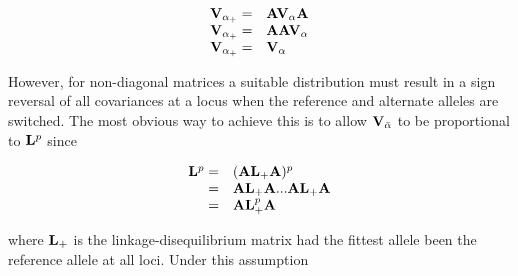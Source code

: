 \documentclass[12pt]{article}
\makeatletter
\providecommand{\DIFaddtex}[1]{{\protect\color{blue}\uwave{#1}}} %
\providecommand{\DIFdeltex}[1]{{\protect\color{red}\sout{#1}}} %
\providecommand{\DIFaddbegin}{} %
\providecommand{\DIFaddend}{} %
\providecommand{\DIFdelbegin}{} %
\providecommand{\DIFdelend}{} %
\providecommand{\DIFadd}[1]{\texorpdfstring{\DIFaddtex{#1}}{#1}} %
\providecommand{\DIFdel}[1]{\texorpdfstring{\DIFdeltex{#1}}{}} %
\newcommand{\DIFscaledelfig}{0.5}
\newlength{\DIFdelgraphicswidth} %
\newlength{\DIFdelgraphicsheight} %
\newcommand{\DIFaddincludegraphics}[2][]{{\color{blue}\fbox{\DIFOincludegraphics[#1]{#2}}}} %
\newcommand{\DIFdelincludegraphics}[2][]{%
\sbox{\DIFdelgraphicsbox}{\DIFOincludegraphics[#1]{#2}}%
\settoboxwidth{\DIFdelgraphicswidth}{\DIFdelgraphicsbox} %
\settoboxtotalheight{\DIFdelgraphicsheight}{\DIFdelgraphicsbox} %
\scalebox{\DIFscaledelfig}{%
\parbox[b]{\DIFdelgraphicswidth}{\usebox{\DIFdelgraphicsbox}\\[-\baselineskip] \rule{\DIFdelgraphicswidth}{0em}}\llap{\resizebox{\DIFdelgraphicswidth}{\DIFdelgraphicsheight}{%
\setlength{\unitlength}{\DIFdelgraphicswidth}%
\begin{picture}(1,1)%
\thicklines\linethickness{2pt} %
{\color[rgb]{1,0,0}\put(0,0){\framebox(1,1){}}}%
{\color[rgb]{1,0,0}\put(0,0){\line( 1,1){1}}}%
{\color[rgb]{1,0,0}\put(0,1){\line(1,-1){1}}}%
\end{picture}%
}\hspace*{3pt}}} %
} %
\DeclareRobustCommand{\DIFaddbegin}{\DIFOaddbegin \let\includegraphics\DIFaddincludegraphics} %
\DeclareRobustCommand{\DIFaddend}{\DIFOaddend \let\includegraphics\DIFOincludegraphics} %
\DeclareRobustCommand{\DIFdelbegin}{\DIFOdelbegin \let\includegraphics\DIFdelincludegraphics} %
\DeclareRobustCommand{\DIFdelend}{\DIFOaddend \let\includegraphics\DIFOincludegraphics} %
\let\sout@orig\sout %
\renewcommand{\sout}[1]{\ifmmode\text{\sout@orig{\ensuremath{#1}}}\else\sout@orig{#1}\fi} %
\makeatother
\begin{document}
\begin{bibunit}
\begin{equation}
\DIFdelbegin %
\DIFdelend \DIFaddbegin \begin{array}{rl}
{\bf V}_{{\alpha}_{+}} =& {\bf A}{\bf V}_{{\alpha}}{\bf A}\\
{\bf V}_{{\alpha}_{+}} =& {\bf A}{\bf A}{\bf V}_{{\alpha}}\\
{\bf V}_{{\alpha}_{+}} =& {\bf V}_{{\alpha}}\\
\end{array}\DIFaddend 
\end{equation}

However, for non-diagonal matrices a suitable distribution must result in a sign reversal of all covariances at a locus when the reference and alternate alleles are switched. The most obvious way to achieve this is to allow \DIFdelbegin \DIFdel{${\bf V}_{\bar{\alpha}}$ }\DIFdelend \DIFaddbegin \DIFadd{${\bf V}_{{\alpha}}$ }\DIFaddend to be proportional to ${\bf L}^{p}$ since

\begin{equation}
\begin{array}{rl}
{\bf L}^{p}=&({\bf A}{\bf L}_{+}{\bf A})^{p}\\
         =&{\bf A}{\bf L}_{+}{\bf A}...{\bf A}{\bf L}_{+}{\bf A}\\
         =&{\bf A}{\bf L}_{+}^p{\bf A}\\
\end{array}
\end{equation}

where ${\bf L}_{+}$ is the linkage-disequilibrium matrix had the fittest allele been the reference allele at all loci. Under this assumption


\end{bibunit}
\end{document}
